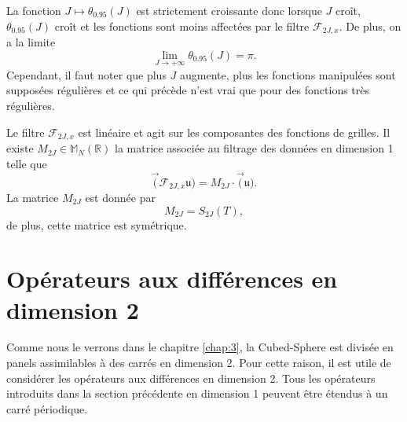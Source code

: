 La fonction $J \mapsto \theta_{0.95}(J)$ est strictement croissante donc lorsque $J$ croît, $\theta_{0.95}(J)$ croît et les fonctions sont moins affectées par le filtre $\mathcal{F}_{2J,x}$. De plus, on a la limite
\begin{equation}
\lim_{J \rightarrow +\infty} \theta_{0.95}(J) = \pi.
\end{equation}
Cependant, il faut noter que plus $J$ augmente, plus les fonctions manipulées sont supposées régulières et ce qui précède n'est vrai que pour des fonctions très régulières.

\begin{remarque}
Le filtre $\mathcal{F}_{2J,x}$ est linéaire et agit sur les composantes des fonctions de grilles. Il existe $M_{2J} \in \mathbb{M}_N \left( \mathbb{R} \right)$ la matrice associée au filtrage des données en dimension 1 telle que
\begin{equation}
\vec( \mathcal{F}_{2J,x} \mathfrak{u}) = M_{2J} \cdot  \vec(\mathfrak{u}).
\end{equation}
La matrice $M_{2J}$ est donnée par
\begin{equation}
M_{2J} = S_{2J}(T),
\label{eq:matrice_filtrage}
\end{equation}
de plus, cette matrice est symétrique.
\end{remarque}































\section{Opérateurs aux différences en dimension 2}

Comme nous le verrons dans le chapitre \ref{chap:3}, la Cubed-Sphere est divisée en panels assimilables à des carrés en dimension 2. Pour cette raison, il est utile de considérer les opérateurs aux différences en dimension 2. Tous les opérateurs introduits dans la section précédente en dimension 1 peuvent être étendus à un carré périodique.


